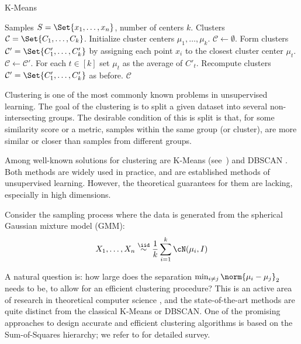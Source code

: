 \begin{algorithm}[t]
    \caption{K-Means}
    \label{alg:kmeans}
        \begin{algorithmic}[1]
            \Require Samples \(S = \Set{x_1, \ldots, x_{n}}\), number of centers \(k\).
            \Ensure Clusters \(\mathcal{C} = \Set{C_1, \ldots, C_k}\). 
            \State Initialize cluster centers \(\mu_1, \ldots, \mu_k\). 
            \State \(\mathcal{C} \gets \emptyset\).
            \State Form clusters \(\mathcal{C}' = \Set{C'_1, \ldots, C'_k}\) by assigning each point \(x_i\) to the closest cluster center \(\mu_t\).
                \State \(\mathcal{C} \gets \mathcal{C}'\).
                \State For each \(t \in [k]\) set \(\mu_t\) as the average of \(C'_t\).
                \State Recompute clusters \(\mathcal{C}' = \Set{C'_1, \ldots, C'_k}\) as before.
            \EndWhile
        \State \Return \(\mathcal{C}\)
        \end{algorithmic}
    \end{algorithm}


Clustering is one of the most commonly known problems in unsupervised learning.
The goal of the clustering is to split a given dataset into several non-intersecting groups.
The desirable condition of this is split is that, for some similarity score or a metric, samples within the same group (or cluster), 
are more similar or closer than samples from different groups.

Among well-known solutions for clustering are K-Means (see~) and DBSCAN .
Both methods are widely used in practice, and are established methods of unsupervised learning.
However, the theoretical guarantees for them are lacking, especially in high dimensions. 

Consider the sampling process where the data is generated from the spherical Gaussian mixture model (GMM):
\begin{equation}
    X_1, \ldots, X_n \overset{\iid}{\sim} \frac{1}{k} \sum_{i=1}^k \cN(\mu_i, I)
\end{equation}

A natural question is: how large does the separation \(\min_{i \neq j} \norm{\mu_i - \mu_j}_2\) needs to be,
to allow for an efficient clustering procedure? 
This is an active area of research in theoretical computer science , 
and the state-of-the-art methods are quite distinct from the classical K-Means or DBSCAN.
One of the promising approaches to design accurate and efficient clustering algorithms is 
based on the Sum-of-Squares hierarchy; we refer to  for detailed survey.

